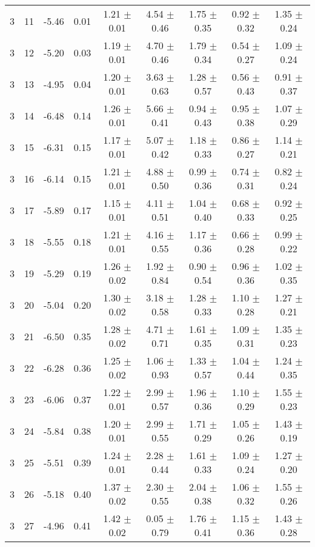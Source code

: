 \begin{landscape}
\begin{longtable}{ccccccccc}
   3 & 11 & -5.46 & 0.01 & 1.21 $\pm$ 0.01 & 4.54 $\pm$ 0.46 & 1.75 $\pm$ 0.35 & 0.92 $\pm$ 0.32 & 1.35 $\pm$ 0.24\\
   3 & 12 & -5.20 & 0.03 & 1.19 $\pm$ 0.01 & 4.70 $\pm$ 0.46 & 1.79 $\pm$ 0.34 & 0.54 $\pm$ 0.27 & 1.09 $\pm$ 0.24\\
   3 & 13 & -4.95 & 0.04 & 1.20 $\pm$ 0.01 & 3.63 $\pm$ 0.63 & 1.28 $\pm$ 0.57 & 0.56 $\pm$ 0.43 & 0.91 $\pm$ 0.37\\
   3 & 14 & -6.48 & 0.14 & 1.26 $\pm$ 0.01 & 5.66 $\pm$ 0.41 & 0.94 $\pm$ 0.43 & 0.95 $\pm$ 0.38 & 1.07 $\pm$ 0.29\\
   3 & 15 & -6.31 & 0.15 & 1.17 $\pm$ 0.01 & 5.07 $\pm$ 0.42 & 1.18 $\pm$ 0.33 & 0.86 $\pm$ 0.27 & 1.14 $\pm$ 0.21\\
   3 & 16 & -6.14 & 0.15 & 1.21 $\pm$ 0.01 & 4.88 $\pm$ 0.50 & 0.99 $\pm$ 0.36 & 0.74 $\pm$ 0.31 & 0.82 $\pm$ 0.24\\
   3 & 17 & -5.89 & 0.17 & 1.15 $\pm$ 0.01 & 4.11 $\pm$ 0.51 & 1.04 $\pm$ 0.40 & 0.68 $\pm$ 0.33 & 0.92 $\pm$ 0.25\\
   3 & 18 & -5.55 & 0.18 & 1.21 $\pm$ 0.01 & 4.16 $\pm$ 0.55 & 1.17 $\pm$ 0.36 & 0.66 $\pm$ 0.28 & 0.99 $\pm$ 0.22\\
   3 & 19 & -5.29 & 0.19 & 1.26 $\pm$ 0.02 & 1.92 $\pm$ 0.84 & 0.90 $\pm$ 0.54 & 0.96 $\pm$ 0.36 & 1.02 $\pm$ 0.35\\
   3 & 20 & -5.04 & 0.20 & 1.30 $\pm$ 0.02 & 3.18 $\pm$ 0.58 & 1.28 $\pm$ 0.33 & 1.10 $\pm$ 0.28 & 1.27 $\pm$ 0.21\\
   3 & 21 & -6.50 & 0.35 & 1.28 $\pm$ 0.02 & 4.71 $\pm$ 0.71 & 1.61 $\pm$ 0.35 & 1.09 $\pm$ 0.31 & 1.35 $\pm$ 0.23\\
   3 & 22 & -6.28 & 0.36 & 1.25 $\pm$ 0.02 & 1.06 $\pm$ 0.93 & 1.33 $\pm$ 0.57 & 1.04 $\pm$ 0.44 & 1.24 $\pm$ 0.35\\
   3 & 23 & -6.06 & 0.37 & 1.22 $\pm$ 0.01 & 2.99 $\pm$ 0.57 & 1.96 $\pm$ 0.36 & 1.10 $\pm$ 0.29 & 1.55 $\pm$ 0.23\\
   3 & 24 & -5.84 & 0.38 & 1.20 $\pm$ 0.01 & 2.99 $\pm$ 0.55 & 1.71 $\pm$ 0.29 & 1.05 $\pm$ 0.26 & 1.43 $\pm$ 0.19\\
   3 & 25 & -5.51 & 0.39 & 1.24 $\pm$ 0.01 & 2.28 $\pm$ 0.44 & 1.61 $\pm$ 0.33 & 1.09 $\pm$ 0.24 & 1.27 $\pm$ 0.20\\
   3 & 26 & -5.18 & 0.40 & 1.37 $\pm$ 0.02 & 2.30 $\pm$ 0.55 & 2.04 $\pm$ 0.38 & 1.06 $\pm$ 0.32 & 1.55 $\pm$ 0.26\\
   3 & 27 & -4.96 & 0.41 & 1.42 $\pm$ 0.02 & 0.05 $\pm$ 0.79 & 1.76 $\pm$ 0.41 & 1.15 $\pm$ 0.36 & 1.43 $\pm$ 0.28\\

\end{longtable}
\end{landscape}
